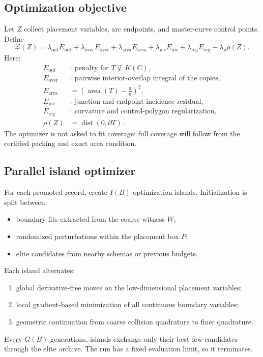 \documentclass[11pt]{article}
\newcommand{\area}{\operatorname{area}}
\newcommand{\dist}{\operatorname{dist}}
\begin{document}
\subsection{Optimization objective}

Let $Z$ collect placement variables, arc endpoints, and master-curve control points. Define
\begin{equation}
\mathcal L(Z)=
\lambda_{\mathrm{out}}E_{\mathrm{out}}
+\lambda_{\mathrm{over}}E_{\mathrm{over}}
+\lambda_{\mathrm{area}}E_{\mathrm{area}}
+\lambda_{\mathrm{inc}}E_{\mathrm{inc}}
+\lambda_{\mathrm{reg}}E_{\mathrm{reg}}
-\lambda_{\rho}\rho(Z).
\label{eq:loss}
\end{equation}
Here:
\begin{align*}
E_{\mathrm{out}}&:\ \text{penalty for }T\not\subseteq K(C),\\
E_{\mathrm{over}}&:\ \text{pairwise interior-overlap integral of the copies},\\
E_{\mathrm{area}}&=\left(\area(T)-\frac{\pi}{n}\right)^2,\\
E_{\mathrm{inc}}&:\ \text{junction and endpoint incidence residual},\\
E_{\mathrm{reg}}&:\ \text{curvature and control-polygon regularization},\\
\rho(Z)&=\dist(0,\partial T).
\end{align*}
The optimizer is not asked to fit coverage: full coverage will follow from the certified packing and exact area condition.

\subsection{Parallel island optimizer}

For each promoted record, create $I(B)$ optimization islands. Initialization is split between:
\begin{itemize}[leftmargin=7mm]
\item boundary fits extracted from the coarse witness $W$;
\item randomized perturbations within the placement box $P$;
\item elite candidates from nearby schemas or previous budgets.
\end{itemize}
Each island alternates:
\begin{enumerate}[leftmargin=9mm]
\item global derivative-free moves on the low-dimensional placement variables;
\item local gradient-based minimization of all continuous boundary variables;
\item geometric continuation from coarse collision quadrature to finer quadrature.
\end{enumerate}
Every $G(B)$ generations, islands exchange only their best few candidates through the elite archive. The run has a fixed evaluation limit, so it terminates.
\end{document}
